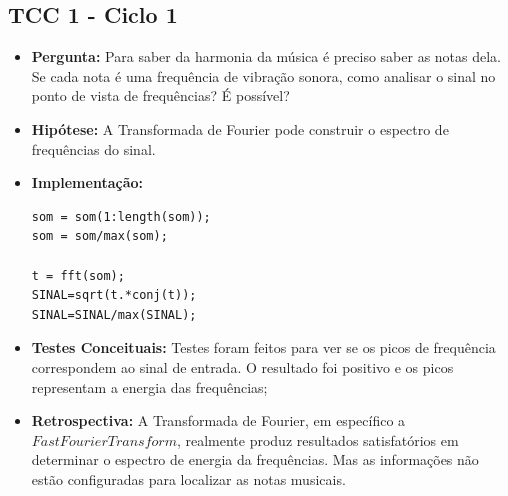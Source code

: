 \subsection{TCC 1 - Ciclo 1}
\begin{itemize}
\item \textbf{Pergunta:} Para saber da harmonia da música é preciso saber as notas dela. Se cada nota é uma frequência de vibração sonora, como analisar o sinal no ponto de vista de frequências? É possível?
\item \textbf{Hipótese:} A Transformada de Fourier pode construir o espectro de frequências do sinal.
\item \textbf{Implementação:} 
\begin{lstlisting}
som = som(1:length(som));
som = som/max(som);

t = fft(som);
SINAL=sqrt(t.*conj(t));
SINAL=SINAL/max(SINAL);
\end{lstlisting}
\item \textbf{Testes Conceituais:} Testes foram feitos para ver se os picos de frequência correspondem ao sinal de entrada. O resultado foi positivo e os picos representam a energia das frequências;
\item \textbf{Retrospectiva:} A Transformada de Fourier, em específico a $Fast Fourier Transform$, realmente produz resultados satisfatórios em determinar o espectro de energia da frequências. Mas as informações não estão configuradas para localizar as notas musicais.
\end{itemize}

